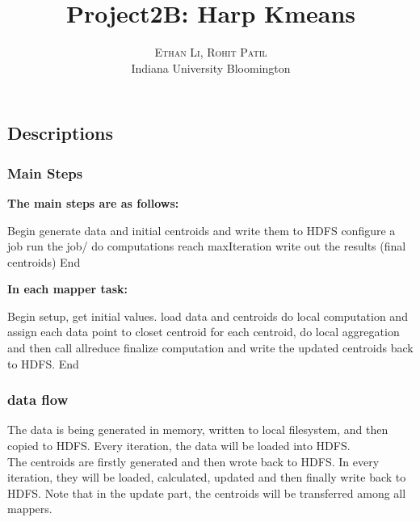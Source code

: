 \documentclass[paper=letter, fontsize=12pt]{article}
\title{\vspace{-15mm}\fontsize{24pt}{10pt}\selectfont\textbf{Project2B: Harp Kmeans}} %
\author{
\large
{\textsc{Ethan Li, Rohit Patil}}\\[2mm]
\normalsize {Indiana University Bloomington}\\ %
}
\date{}
\begin{document}
\maketitle %
\thispagestyle{fancy} %

\subsection{Descriptions}

\subsubsection{Main Steps}

\textbf{The main steps are as follows:}
{\small
\begin{center}
\begin{algorithmic}
\State Begin
\State generate data and initial centroids and write them to HDFS
\Repeat
\State configure a job
\State run the job/ do computations
\Until reach maxIteration
\State write out the results (final centroids)
\State End
\end{algorithmic}
\end{center}
}

\textbf{In each mapper task:}
{\small
\begin{center}
\begin{algorithmic}
\State Begin
\State setup, get initial values.
\State load data and centroids
\State do local computation and assign each data point to closet centroid
\State for each centroid, do local aggregation and then call allreduce
\State finalize computation and write the updated centroids back to HDFS.
\State End
\end{algorithmic}
\end{center}
}

\subsubsection{data flow}
 
 The data is being generated in memory, written to local filesystem, and then copied to HDFS. Every iteration, the data will be loaded into HDFS.\\
 The centroids are firstly generated and then wrote back to HDFS. In every iteration, they will be loaded, calculated, updated and then finally write back to HDFS. Note that in the update part, the centroids will be transferred among all mappers.
 
\end{document}
